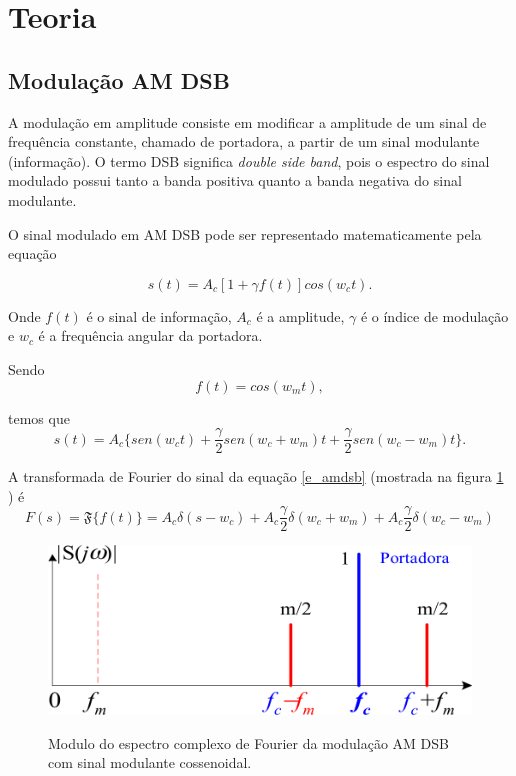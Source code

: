 \newpage
\section{Teoria}
\subsection{Modulação AM DSB}
A modulação em amplitude consiste em modificar a amplitude de um sinal de frequência constante, chamado de portadora, a partir de um sinal modulante (informação). O termo DSB significa \textit{double side band}, pois o espectro do sinal modulado possui tanto a banda positiva quanto a banda negativa do sinal modulante.

O sinal modulado em AM DSB pode ser representado matematicamente pela equação

\begin{equation}
s(t) = A_c[1+\gamma f(t)]cos(w_c t).
\label{e_am}
\end{equation}

Onde $f(t)$ é o sinal de informação, $A_c$ é a amplitude, $\gamma$ é o índice de modulação e $w_c$ é a frequência angular da portadora.

Sendo 
\[ f(t) = cos(w_m t), \]

temos que
\begin{equation}
s(t) = A_c  \bigg \{ sen(w_c t) + \frac{\gamma}{2}sen(w_c + w_m)t + \frac{\gamma}{2}sen(w_c - w_m)t \bigg  \} .
\label{e_amdsb}
\end{equation}

A transformada de Fourier do sinal da equação \ref{e_amdsb} (mostrada na figura \ref{f_fourier_am_dsb} ) é 
\[
F(s) = \mathfrak{F} \big \{ f(t) \big \} = A_c \delta (s - w_c) + A_c \frac{\gamma}{2}\delta(w_c  + w_m) + A_c \frac{\gamma}{2}\delta(w_c  - w_m)
\]

\begin{figure}[H]
    \centering
    \caption{Modulo do espectro complexo de Fourier da modulação AM DSB com sinal modulante cossenoidal.}
    \includegraphics[scale=0.3]{Imagens/fourier_am_dsb.png}
    \label{f_fourier_am_dsb}
\end{figure}


